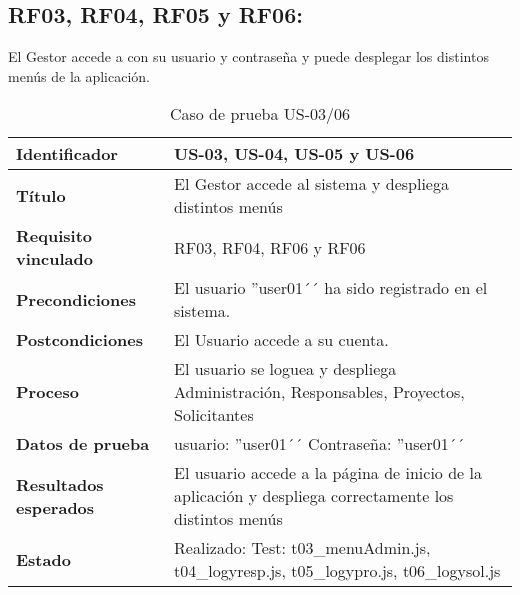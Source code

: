 \subsection{RF03, RF04, RF05 y RF06:} El Gestor accede a con su usuario y contraseña y puede desplegar los distintos menús de la aplicación.
\begin{table}[H]
	\centering
	\renewcommand{\arraystretch}{1.3} 
	\begin{tabularx}{\textwidth}{|l|X|}
		\hline
		\textbf{Identificador} & US-03, US-04, US-05 y US-06 \\
		\hline
		\textbf{Título} & El Gestor accede al sistema y despliega distintos menús \\
		\hline
		\textbf{Requisito vinculado} & RF03, RF04, RF06 y RF06 \\
		\hline
		\textbf{Precondiciones} & El usuario ''user01´´ ha sido registrado en el sistema.\\
		\hline
		\textbf{Postcondiciones} & El Usuario accede a su cuenta. \\
		\hline
		\textbf{Proceso} & El usuario se loguea y despliega Administración, Responsables, Proyectos, Solicitantes\\
		\hline
		\textbf{Datos de prueba} & usuario: ''user01´´ Contraseña: ''user01´´ \\
		\hline
		\textbf{Resultados esperados} & El usuario accede a la página de inicio de la aplicación y despliega correctamente los distintos menús \\
		\hline
		\textbf{Estado} & Realizado: Test: t03\_menuAdmin.js, t04\_logyresp.js, t05\_logypro.js, t06\_logysol.js\\
		\hline
	\end{tabularx}
	\caption{Caso de prueba US-03/06}
	\label{tab:caso_us03}
\end{table}
